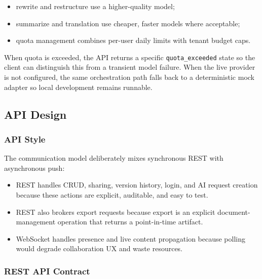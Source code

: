 \begin{itemize}[leftmargin=1.3em]
    \item rewrite and restructure use a higher-quality model;
    \item summarize and translation use cheaper, faster models where acceptable;
    \item quota management combines per-user daily limits with tenant budget caps.
\end{itemize}

When quota is exceeded, the API returns a specific \texttt{quota\_exceeded} state so the client can distinguish this from a transient model failure. When the live provider is not configured, the same orchestration path falls back to a deterministic mock adapter so local development remains runnable.

\subsection{API Design}

\subsubsection{API Style}

The communication model deliberately mixes synchronous REST with asynchronous push:

\begin{itemize}[leftmargin=1.3em]
    \item REST handles CRUD, sharing, version history, login, and AI request creation because these actions are explicit, auditable, and easy to test.
    \item REST also brokers export requests because export is an explicit document-management operation that returns a point-in-time artifact.
    \item WebSocket handles presence and live content propagation because polling would degrade collaboration UX and waste resources.
\end{itemize}

\subsubsection{REST API Contract}

